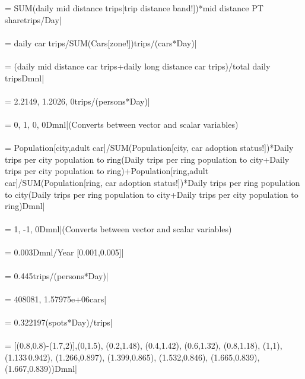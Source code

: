  = {\small SUM(daily mid distance trips[trip distance band!])*mid distance PT sharetrips/Day|} \\ \\ 
 = {\small daily car trips/SUM(Cars[zone!])trips/(cars*Day)|} \\ \\ 
 = {\small (daily mid distance car trips+daily long distance car trips)/total daily tripsDmnl|} \\ \\ 
 = {\small 2.2149, 1.2026, 0trips/(persons*Day)|} \\ \\ 
 = {\small 0, 1, 0, 0Dmnl|}{\small  (Converts between vector and scalar variables)} \\ \\ 
 = {\small Population[city,adult car]/SUM(Population[city, car adoption status!])*Daily trips per city population to ring\/(Daily trips per ring population to city+Daily trips per city population to ring)+Population[ring,adult car]/SUM(Population[ring, car adoption status!])*Daily trips per ring population to city\/(Daily trips per ring population to city+Daily trips per city population to ring)Dmnl|} \\ \\ 
 = {\small 1, -1, 0Dmnl|}{\small  (Converts between vector and scalar variables)} \\ \\ 
 = {\small 0.003Dmnl/Year [0.001,0.005]|} \\ \\ 
 = {\small 0.445trips/(persons*Day)|} \\ \\ 
 = {\small 408081, 1.57975e+06cars|} \\ \\ 
 = {\small 0.322197(spots*Day)/trips|} \\ \\ 
 = {\small [(0.8,0.8)-(1.7,2)],(0,1.5), (0.2,1.48), (0.4,1.42), (0.6,1.32), (0.8,1.18), (1,1), (1.133\,0.942), (1.266,0.897), (1.399,0.865), (1.532,0.846), (1.665,0.839), (1.667,0.839))Dmnl|} \\ \\ 
